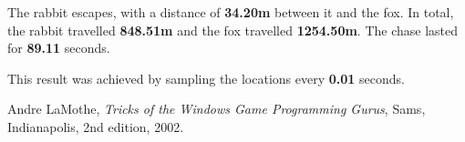 \documentclass[11pt]{article}
\begin{document}
The rabbit escapes, with a distance of \textbf{34.20m} between it and the fox. In total, the rabbit travelled \textbf{848.51m} and the fox travelled \textbf{1254.50m}. The chase lasted for \textbf{89.11} seconds. 

This result was achieved by sampling the locations every \textbf{0.01} seconds.

\begin{figure}[htp]%
    \centering
    \hspace*{-2cm}
    \vspace*{-14cm}
\end{figure}

\begin{thebibliography}{9}

  Andre LaMothe,
  \emph{Tricks of the Windows Game Programming Gurus},
  Sams, Indianapolis,
  2nd edition,
  2002.

\end{thebibliography}
\end{document}

